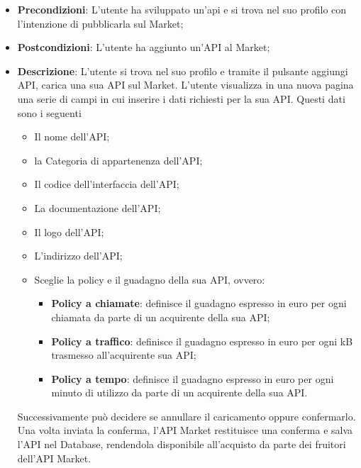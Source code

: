 \begin{itemize}
	\item \textbf{Precondizioni}: L'utente ha sviluppato un'api e si trova nel suo profilo con l'intenzione di pubblicarla sul Market;
	\item \textbf{Postcondizioni}: L'utente ha aggiunto un'API al Market;
	\item \textbf{Descrizione}: L'utente si trova nel suo profilo e tramite il pulsante aggiungi API, carica una sua API sul Market. L'utente visualizza in una nuova pagina una serie di campi in cui inserire i dati richiesti per la sua API. Questi dati sono i seguenti
	\begin{itemize}
		\item Il nome dell'API;
		\item la Categoria di appartenenza dell'API;
		\item Il codice dell'interfaccia dell'API;
		\item La documentazione dell'API;
		\item Il logo dell'API;
		\item L'indirizzo dell'API;
		\item Sceglie la policy e il guadagno della sua API, ovvero:
		\begin{itemize}
			\item \textbf{Policy a chiamate}: definisce il guadagno espresso in euro per ogni chiamata da parte di un acquirente della sua API;
			\item \textbf{Policy a traffico}: definisce il guadagno espresso in euro per ogni kB trasmesso all'acquirente sua API;
			\item \textbf{Policy a tempo}: definisce il guadagno espresso in euro per ogni minuto di utilizzo da parte di un acquirente della sua API.
		\end{itemize}		
	\end{itemize}
	Successivamente può decidere se annullare il caricamento oppure confermarlo. Una volta inviata la conferma, l'API Market restituisce una conferma e salva l'API nel Database, rendendola disponibile all'acquisto da parte dei fruitori dell'API Market.
\end{itemize}
